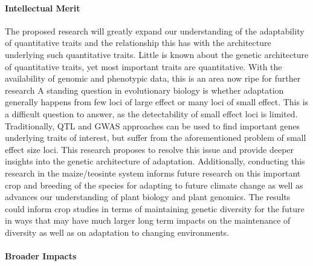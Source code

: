 \paragraph{Intellectual Merit}  

The proposed research will greatly expand our understanding of the adaptability of quantitative traits and the relationship this has with the architecture underlying such quantitative traits. Little is known about the genetic architecture of quantitative traits, yet most important traits are quantitative. With the availability of genomic and phenotypic data, this is an area now ripe for further research %
A standing question in evolutionary biology is whether adaptation generally happens from few loci of large effect or many loci of small effect. This is a difficult question to answer, as the detectability of small effect loci is limited. Traditionally, QTL and GWAS approaches can be used to find important genes underlying traits of interest, but suffer from the aforementioned problem of small effect size loci. This research proposes to resolve this issue and provide deeper insights into the genetic architecture of adaptation. Additionally, conducting this research in the maize\//teosinte system informs future research on this important crop and breeding of the species for adapting to future climate change as well as advances our understanding of plant biology and plant genomics. The results could inform %
crop studies in terms of maintaining genetic diversity for the future in ways that may have much larger long term impacts on the maintenance of diversity as well as on adaptation to changing environments.

\paragraph{Broader Impacts}

